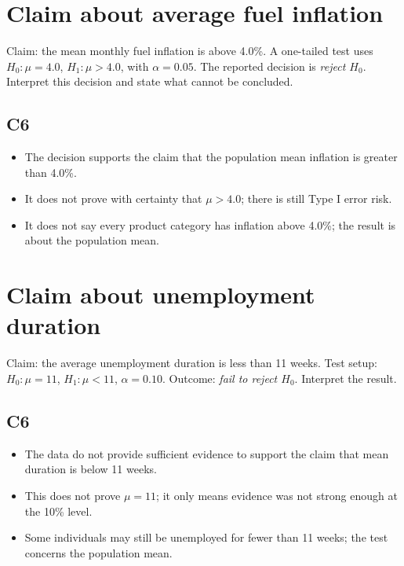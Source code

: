 \begin{ExamProblems}

\item
\section{Claim about average fuel inflation}
Claim: the mean monthly fuel inflation is above 4.0\%. A one-tailed test uses \(H_0\colon \mu=4.0\), \(H_1\colon \mu>4.0\), with \(\alpha=0.05\). The reported decision is \textit{reject \(H_0\)}. Interpret this decision and state what cannot be concluded.

\subsection*{C6}
\begin{itemize}
    \item The decision supports the claim that the population mean inflation is greater than 4.0\%.
    \item It does not prove with certainty that \(\mu>4.0\); there is still Type I error risk.
    \item It does not say every product category has inflation above 4.0\%; the result is about the population mean.
\end{itemize}

\item
\section{Claim about unemployment duration}
Claim: the average unemployment duration is less than 11 weeks. Test setup: \(H_0\colon \mu=11\), \(H_1\colon \mu<11\), \(\alpha=0.10\). Outcome: \textit{fail to reject \(H_0\)}. Interpret the result.

\subsection*{C6}
\begin{itemize}
    \item The data do not provide sufficient evidence to support the claim that mean duration is below 11 weeks.
    \item This does not prove \(\mu=11\); it only means evidence was not strong enough at the 10\% level.
    \item Some individuals may still be unemployed for fewer than 11 weeks; the test concerns the population mean.
\end{itemize}


\end{ExamProblems}
